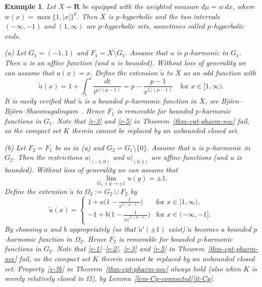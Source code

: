 \documentclass[a4paper,twoside]{article}
\theoremstyle{propositional}
\theoremstyle{descriptive}
\newtheorem{example}[thm]{Example}
\theoremstyle{remarkstyle}
\newcommand{\setm}{\setminus}
\newcommand{\Om}{\Omega}
\newcommand{\p}{{$p\mspace{1mu}$}}
\newcommand{\R}{\mathbf{R}}
\newcommand{\ut}{\tilde{u}}
\numberwithin{equation}{section}
\begin{document}
\begin{example} \label{ex-hyp-R}
Let $X=\R$ be equipped with the weighted measure $d\mu=w\,dx$,
where $w(x)=\max\{1,|x|\}^p$.
Then $X$ is \p-hyperbolic and the two 
intervals $(-\infty,-1)$ and $(1,\infty)$ are \p-hyperbolic sets,
sometimes called \p-hyperbolic ends.

(a)
Let $G_1=(-1,1)$ and  $F_1=X \setm G_1$. 
Assume that $u$ is \p-harmonic in $G_1$. 
Then 
$u$ is an affine function
(and $u$ is bounded).
Without loss of generality we can assume that $u(x)=x$.
Define the extension $\ut$ to $X$ 
as an odd function with
\begin{equation*} %
\ut(x)= 1 + \int_1^x \frac{dt}{t^{p/(p-1)}} 
= p- \frac{p-1}{x^{1/(p-1)}}
\quad \text{for } x\in [1,\infty).
\end{equation*}
It is easily verified that $\ut$ is a bounded \p-harmonic function in $X$,
see Bj\"orn--Bj\"orn--Shan\-mu\-ga\-lin\-gam~\cite[Lemma~6.2]{BBSliouville}.
Hence 
$F_1$ is removable for bounded \p-harmonic functions in $G_1$.
Note that \ref{r-3} and \ref{r-5} in Theorem~\ref{thm-cpt-pharm-nec}
fail, so the compact set $K$ therein cannot be replaced by an unbounded closed set.

(b)
Let $F_2=F_1$ be as in (a) and $G_2=G_1 \setm \{0\}$.
Assume that $u$ is \p-harmonic in $G_2$. 
Then the restrictions $u|_{(-1,0)}$ and $u|_{(0,1)}$
are affine functions
(and $u$ is bounded).
Without loss of generality we can assume that
\[
     \lim_{G_2 \ni y \to \pm 1} u(y)=\pm 1.
\]
Define the extension $\ut$ to $\Om_2 := G_2 \cup F_2$
by 
\[
\ut(x)= \begin{cases}
 \displaystyle 
1+ a\biggl(1-\frac{1}{x^{1/(p-1)}}\biggr)
   & \text{for } x\in [1,\infty), \\
   \displaystyle 
-1+ b\biggl(1-\frac{1}{|x|^{1/(p-1)}}\biggr)
 & \text{for }  x\in (-\infty,-1].
\end{cases}
\]
By choosing $a$ and $b$ appropriately (so that $\ut'(\pm 1)$ exist)
$\ut$ becomes a bounded \p-harmonic function in $\Om_2$.
Hence 
$F_2$ is removable for bounded \p-harmonic functions in $G_2$.
Note that \ref{r-1}--\ref{r-2}, \ref{r-3} and \ref{r-5} 
in Theorem~\ref{thm-cpt-pharm-nec}
fail, so the compact set $K$ therein cannot be replaced by an unbounded closed set.
Property~\ref{r-3b} in Theorem~\ref{thm-cpt-pharm-nec}
always hold (also when $K$
is merely relatively closed in $\Om$), by 
Lemma~\ref{lem-Cp-connected}\ref{it-Cp}.
\end{example}
\end{document}
